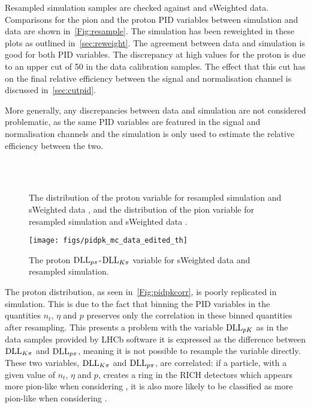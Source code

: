   Resampled simulation samples are checked against \LbKjpsi and \Lbpijpsi sWeighted data. Comparisons for the pion \dllkpi and the proton \dllppi PID variables between simulation and data are shown in~\autoref{Fig:resample}. The simulation has been reweighted in these plots as outlined in~\autoref{sec:reweight}. The agreement between data and simulation is good for both PID variables. The discrepancy at high values for the proton \dllppi is due to an upper cut of 50 in the data calibration samples. The effect that this cut has on the final relative efficiency between the signal and normalisation channel is discussed in~\autoref{sec:cutpid}. %

More generally, any discrepancies between data and simulation are not considered problematic, as the same PID variables are featured in the signal and normalisation channels and the simulation is only used to estimate the relative efficiency between the two. %

  \begin{figure}[!ht]\def\nh{0.3\textwidth}
  \centering
    \\
      \\
  \caption{The distribution of the proton \dllppi variable for resampled \LbKjpsi simulation and \LbKjpsi sWeighted data \protect{}, and the distribution of the pion \dllkpi variable for resampled \Lbpijpsi simulation and \Lbpijpsi sWeighted data \protect{}.}
  \label{Fig:resample}
  \end{figure}



\begin{figure}[!t]\def\nh{0.3\textwidth}
           \centering   
       \texttt{[image: figs/pidpk\_mc\_data\_edited\_th]}   %
        \caption{The proton $\mathrm{DLL}_{{p}{\pi}}$-$\mathrm{DLL}_{{K}{\pi}}$  variable for \LbKjpsi sWeighted data and \LbKjpsi resampled simulation.}%
 \label{Fig:pidpkcorr}       
\end{figure}
The proton \dllpk distribution, as seen in~\autoref{Fig:pidpkcorr}, is poorly replicated in simulation. This is due to the fact that binning the PID variables in the quantities $n_{t}$, $\eta$ and $p$ preserves only the correlation in these binned quantities after resampling. This presents a problem with the variable $\mathrm{DLL}_{{p}{K}}$ as in the data samples provided by LHCb software it is expressed as the difference between $\mathrm{DLL}_{{K}{\pi}}$ and $\mathrm{DLL}_{{p}{\pi}}$, meaning it is not possible to resample the variable \dllpk directly. These two variables, $\mathrm{DLL}_{{K}{\pi}}$ and $\mathrm{DLL}_{{p}{\pi}}$, are correlated: if a particle, with a given value of $n_{t}$, $\eta$ and $p$, creates a ring in the RICH detectors which appears more pion-like when considering \dllppi,  it is also more likely to be classified as more pion-like when considering \dllkpi.


